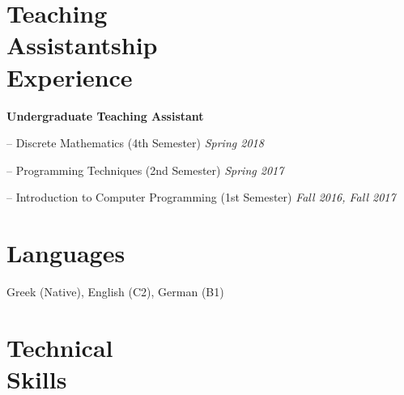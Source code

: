 \documentclass[margin, 10pt]{res}
\begin{document}
\begin{resume}
\section{Teaching \\ Assistantship \\ Experience} 
\textbf{Undergraduate Teaching Assistant}
\begin{compactitem}
    \item[--] Discrete Mathematics (4th Semester) \hfill \emph{Spring 2018}
    \item[--] Programming Techniques (2nd Semester) \hfill \emph{Spring 2017}
    \item[--] Introduction to Computer Programming (1st Semester) \hfill \emph{Fall 2016, Fall 2017}
\end{compactitem}



\section{Languages} Greek (Native), English (C2), German (B1)


\begin{comment}
\section{Data \\ Analysis \& \\ Visualization \\ Tools} 
\begin{compactitem}
\item[--] Python 
\item[--] Bash 
\item[--] MATLAB 
\item[--] GNU Octave 
\item[--] R
\item[--] Matplotlib 
\item[--] GNUPlot 
\item[--] Pandas
\item[--] Seaborn
\item[--] MySQL 
\item[--] MongoDB 
\end{compactitem}
\end{comment}

\section{Technical \\ Skills}


\end{resume}
\end{document}
